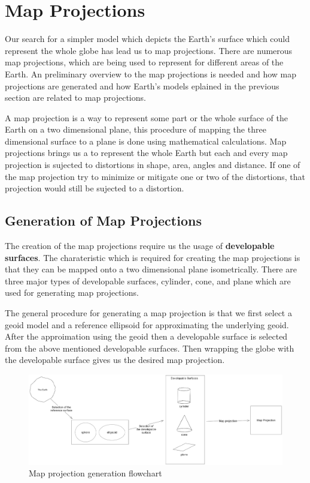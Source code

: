 
\clearpage
\cleardoublepage

\chapter{Map Projections}
Our search for a simpler model which depicts the Earth's surface which could represent the whole globe has lead us to map projections.
There are numerous map projections, which are being used to represent for different areas of the Earth. An preliminary overview to the map projections is needed and how map projections are generated and how Earth's models eplained in the previous section are related to map projections.

A map projection is a way to represent some part or the whole surface of the Earth on a two dimensional plane, this procedure of mapping the three dimensional surface to a plane is done using mathematical calculations.
Map projections brings us a to represent the whole Earth but each and every map projection is sujected to distortions in shape, area, angles and distance. If one of the map projection try to minimize or mitigate one or two of the distortions, that projection would still be sujected to a distortion.

\section{Generation of Map Projections}
The creation of the map projections require us the usage of \textbf{developable surfaces}. The charateristic which is required for creating the map projections is that they can be mapped onto a two dimensional plane isometrically\cite{Patrikalakis_Maekawa_2010}.
There are three major types of developable surfaces, cylinder, cone, and plane which are used for generating map projections.

The general procedure for generating a map projection is that we first select a geoid model and a reference ellipsoid for approximating the underlying geoid. After the approimation using the geoid then a developable surface is selected from the above mentioned developable surfaces.
Then wrapping the globe with the developable surface gives us the desired map projection.

\begin{figure}[h]
    \centering
    \includegraphics[width=1.0\textwidth]{figures/chapter-3/map_projection_creation.png}
    \caption{Map projection generation flowchart  }
    \label{fig:earth-image}
\end{figure}
\newpage
